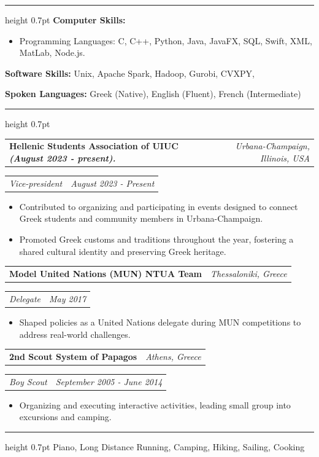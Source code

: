 \documentclass[11pt,a4paper]{article}
\makeatletter
\newcommand{\cvsection}[1]{\par\vspace{13pt}{\bfseries #1}\par\nobreak\hrule height 0.7pt\relax\vspace{2pt}}
\newcommand{\cvrow}[2]{\noindent\begin{tabularx}{\linewidth}{@{}Xr@{}}#1 & #2\end{tabularx}\par}
\newcommand{\entrygap}{\par\vspace{3pt}}
\makeatother
\begin{document}
\cvsection{PERSONAL SKILLS}
\textbf{Computer Skills:}
\begin{itemize}
\item Programming Languages: C, C++, Python, Java, JavaFX, SQL, Swift, XML, MatLab, Node.js.
\end{itemize}
\par\vspace{3pt}
\textbf{Software Skills:} Unix, Apache Spark, Hadoop, Gurobi, CVXPY,
\par\vspace{3pt}
\textbf{Spoken Languages:} Greek (Native), English (Fluent), French (Intermediate)

\cvsection{SOCIETIES \& AFFILIATIONS}
\cvrow{\textbf{Hellenic Students Association of UIUC \textit{(August 2023 - present).}}}{\textit{Urbana-Champaign, Illinois, USA}}
\cvrow{\textit{Vice-president}}{\textit{August 2023 - Present}}
\begin{itemize}
\item Contributed to organizing and participating in events designed to connect Greek students and community members in Urbana-Champaign.
\item Promoted Greek customs and traditions throughout the year, fostering a shared cultural identity and preserving Greek heritage.
\end{itemize}
\entrygap
\cvrow{\textbf{Model United Nations (MUN) NTUA Team}}{\textit{Thessaloniki, Greece}}
\cvrow{\textit{Delegate}}{\textit{May 2017}}
\begin{itemize}
\item Shaped policies as a United Nations delegate during MUN competitions to address real-world challenges.
\end{itemize}
\entrygap
\cvrow{\textbf{2nd Scout System of Papagos}}{\textit{Athens, Greece}}
\cvrow{\textit{Boy Scout}}{\textit{September 2005 - June 2014}}
\begin{itemize}
\item Organizing and executing interactive activities, leading small group into excursions and camping.
\end{itemize}

\cvsection{HOBBIES \& SPORTS}
Piano, Long Distance Running, Camping, Hiking, Sailing, Cooking
\end{document}
